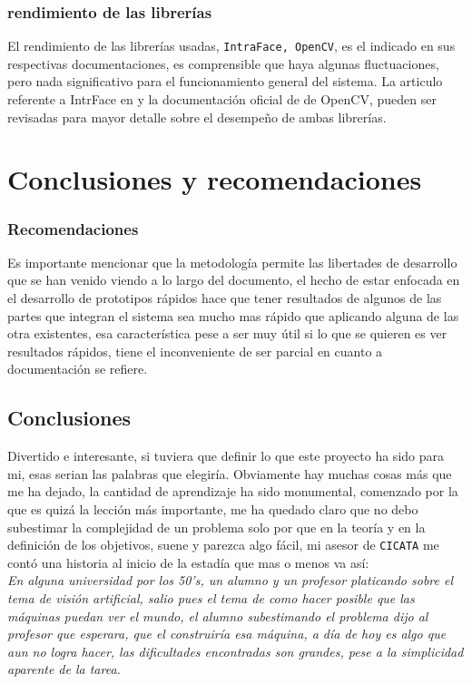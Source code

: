 \documentclass[12pt]{book} %
\begin{document}
	
	\subsection{rendimiento de las librerías}	
			El rendimiento de las librerías usadas, \texttt{IntraFace, OpenCV}, es el indicado en sus respectivas documentaciones, es comprensible
			que haya algunas fluctuaciones, pero nada significativo para el funcionamiento general del sistema. 
			La articulo referente a IntrFace en \cite{IntraFace} y la documentación oficial de de OpenCV, pueden ser revisadas para mayor detalle 
			sobre el desempeño de ambas librerías.

\chapter*{Conclusiones y recomendaciones}
\markboth{}{}
\thispagestyle{empty}
\lhead[\thepage]{}
\rhead[]{\thepage}

\subsection{Recomendaciones}
	Es importante mencionar que la metodología permite las libertades de desarrollo que se han venido viendo a lo largo del documento, el hecho de estar
	enfocada en el desarrollo de prototipos rápidos hace que tener resultados de algunos de las partes que integran el sistema sea mucho mas rápido
	que aplicando alguna de las otra existentes, esa característica pese a ser muy útil si lo que se quieren es ver resultados rápidos, tiene el 
	inconveniente de ser parcial en cuanto a documentación se refiere.
	
\section{Conclusiones}
	Divertido e interesante, si tuviera que definir lo que este proyecto ha sido para mi, esas serian las palabras que elegiría.
	Obviamente hay muchas cosas más que me ha dejado, la cantidad de aprendizaje ha sido monumental, comenzado por la que es quizá la lección más
	importante, me ha quedado claro que no debo subestimar la complejidad de un problema solo por que en la teoría y en la definición de los 
	objetivos, suene y parezca algo fácil, mi asesor de \texttt{CICATA} me contó una historia  al inicio de la estadía que mas o menos va así:\\
	\textit{En alguna universidad por los 50's, un alumno y un profesor platicando sobre el tema de visión artificial, salio pues el tema de 
	como hacer posible que las máquinas puedan ver el mundo, el alumno subestimando el problema dijo al profesor que esperara, que el construiría
	esa máquina, a día de hoy es algo que aun no logra hacer, las dificultades encontradas son grandes, pese a la simplicidad aparente de la tarea.}\\
	
\end{document}
